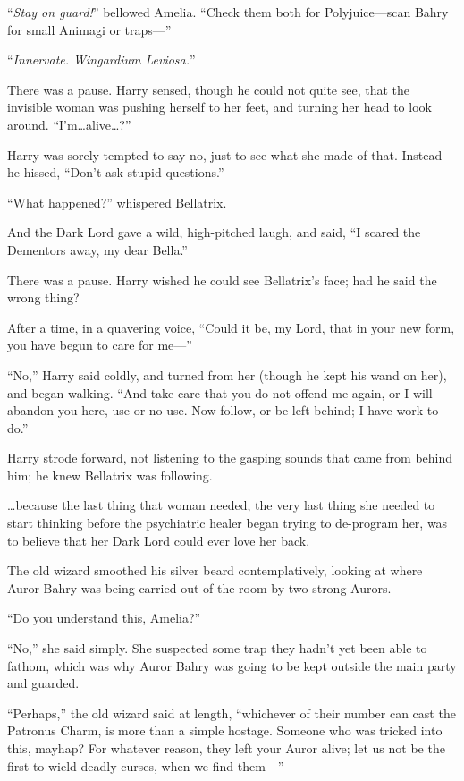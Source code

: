 “\emph{Stay on guard!}” bellowed Amelia. “Check them both for Polyjuice—scan Bahry for small Animagi or traps—”

\later

“\emph{Innervate. Wingardium Leviosa.}”

There was a pause. Harry sensed, though he could not quite see, that the invisible woman was pushing herself to her feet, and turning her head to look around. “I’m…alive…?”

Harry was sorely tempted to say no, just to see what she made of that. Instead he hissed, “Don’t ask stupid questions.”

“What happened?” whispered Bellatrix.

And the Dark Lord gave a wild, high-pitched laugh, and said, “I scared the Dementors away, my dear Bella.”

There was a pause. Harry wished he could see Bellatrix’s face; had he said the wrong thing?

After a time, in a quavering voice, “Could it be, my Lord, that in your new form, you have begun to care for me—”

“No,” Harry said coldly, and turned from her (though he kept his wand on her), and began walking. “And take care that you do not offend me again, or I will abandon you here, use or no use. Now follow, or be left behind; I have work to do.”

Harry strode forward, not listening to the gasping sounds that came from behind him; he knew Bellatrix was following.

…because the last thing that woman needed, the very last thing she needed to start thinking before the psychiatric healer began trying to de-program her, was to believe that her Dark Lord could ever love her back.

\later

The old wizard smoothed his silver beard contemplatively, looking at where Auror Bahry was being carried out of the room by two strong Aurors.

“Do you understand this, Amelia?”

“No,” she said simply. She suspected some trap they hadn’t yet been able to fathom, which was why Auror Bahry was going to be kept outside the main party and guarded.

“Perhaps,” the old wizard said at length, “whichever of their number can cast the Patronus Charm, is more than a simple hostage. Someone who was tricked into this, mayhap? For whatever reason, they left your Auror alive; let us not be the first to wield deadly curses, when we find them—”

